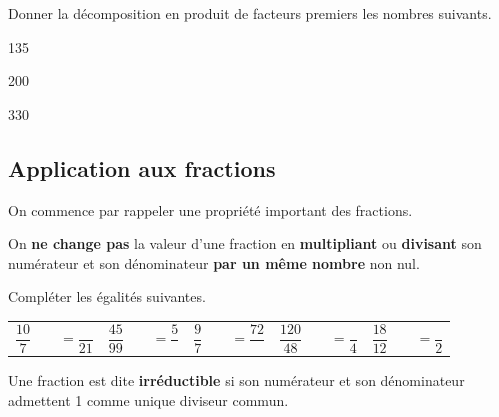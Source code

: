 \documentclass[a4paper]{book}
\begin{document}
    \begin{exemple}
        Donner la décomposition en produit de facteurs premiers les nombres suivants.
        
        \begin{minipage}{0.30\linewidth}
            135
            
            \vspace{4cm}
        \end{minipage}
        \hfill
        \vline
        \hfill
        \begin{minipage}{0.30\linewidth}
            200 
             
            \vspace{4cm}
        \end{minipage}
        \hfill
        \vline
        \hfill
        \begin{minipage}{0.30\linewidth}
            330
            
            \vspace{4cm}
        \end{minipage}  
    \end{exemple}


\subsection{Application aux fractions}

    On commence par rappeler une propriété important des fractions.
    \begin{propriete}
        On \textbf{ne change pas} la valeur d'une fraction en \textbf{multipliant} ou \textbf{divisant} son numérateur et son dénominateur \textbf{par un même nombre} non nul.
    \end{propriete}


    \begin{exemple}
        Compléter les égalités suivantes.

        \bigskip

        \begin{tabular}{c|c|c|c|c}
            $\dfrac{10}{7}\quad \quad =\dfrac{}{21}$ 
            & $\dfrac{45}{99} \quad \quad = \dfrac{5}{}$ 
            & $\dfrac{9}{7} \quad \quad = \dfrac{72}{}$ 
            & $\dfrac{120}{48} \quad \quad = \dfrac{}{4}$
            & $\dfrac{18}{12} \quad \quad = \dfrac{}{2}$
        \end{tabular}   
    \end{exemple}


    \begin{definition}
        Une fraction est dite \textbf{irréductible} si son numérateur et son dénominateur admettent 1 comme unique diviseur commun.
    \end{definition}
\end{document}
